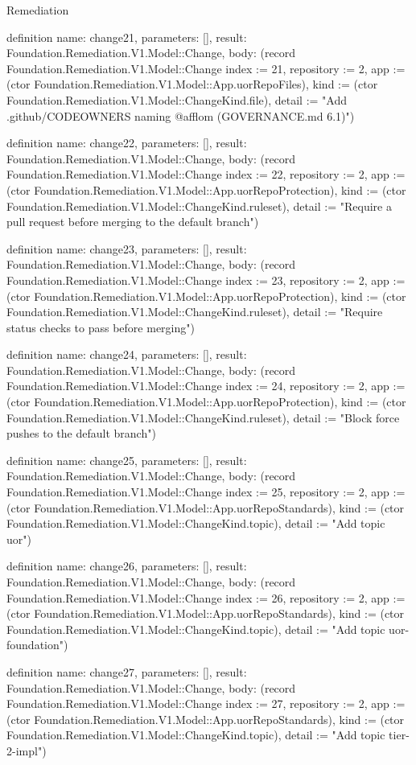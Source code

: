 \begin{lexlean}{Remediation}
\begin{semanticmodule}
definition{
  name: change21,
  parameters: [],
  result: Foundation.Remediation.V1.Model::Change,
  body: (record Foundation.Remediation.V1.Model::Change {index := 21, repository := 2, app := (ctor Foundation.Remediation.V1.Model::App.uorRepoFiles), kind := (ctor Foundation.Remediation.V1.Model::ChangeKind.file), detail := "Add .github/CODEOWNERS naming @afflom (GOVERNANCE.md 6.1)"})
}

definition{
  name: change22,
  parameters: [],
  result: Foundation.Remediation.V1.Model::Change,
  body: (record Foundation.Remediation.V1.Model::Change {index := 22, repository := 2, app := (ctor Foundation.Remediation.V1.Model::App.uorRepoProtection), kind := (ctor Foundation.Remediation.V1.Model::ChangeKind.ruleset), detail := "Require a pull request before merging to the default branch"})
}

definition{
  name: change23,
  parameters: [],
  result: Foundation.Remediation.V1.Model::Change,
  body: (record Foundation.Remediation.V1.Model::Change {index := 23, repository := 2, app := (ctor Foundation.Remediation.V1.Model::App.uorRepoProtection), kind := (ctor Foundation.Remediation.V1.Model::ChangeKind.ruleset), detail := "Require status checks to pass before merging"})
}

definition{
  name: change24,
  parameters: [],
  result: Foundation.Remediation.V1.Model::Change,
  body: (record Foundation.Remediation.V1.Model::Change {index := 24, repository := 2, app := (ctor Foundation.Remediation.V1.Model::App.uorRepoProtection), kind := (ctor Foundation.Remediation.V1.Model::ChangeKind.ruleset), detail := "Block force pushes to the default branch"})
}

definition{
  name: change25,
  parameters: [],
  result: Foundation.Remediation.V1.Model::Change,
  body: (record Foundation.Remediation.V1.Model::Change {index := 25, repository := 2, app := (ctor Foundation.Remediation.V1.Model::App.uorRepoStandards), kind := (ctor Foundation.Remediation.V1.Model::ChangeKind.topic), detail := "Add topic uor"})
}

definition{
  name: change26,
  parameters: [],
  result: Foundation.Remediation.V1.Model::Change,
  body: (record Foundation.Remediation.V1.Model::Change {index := 26, repository := 2, app := (ctor Foundation.Remediation.V1.Model::App.uorRepoStandards), kind := (ctor Foundation.Remediation.V1.Model::ChangeKind.topic), detail := "Add topic uor-foundation"})
}

definition{
  name: change27,
  parameters: [],
  result: Foundation.Remediation.V1.Model::Change,
  body: (record Foundation.Remediation.V1.Model::Change {index := 27, repository := 2, app := (ctor Foundation.Remediation.V1.Model::App.uorRepoStandards), kind := (ctor Foundation.Remediation.V1.Model::ChangeKind.topic), detail := "Add topic tier-2-impl"})
}


\end{semanticmodule}
\end{lexlean}
